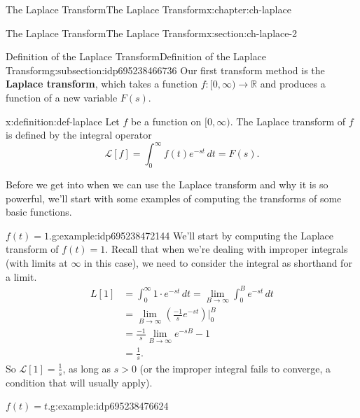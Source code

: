 \documentclass[oneside,10pt,]{book}
\newcommand{\terminology}[1]{\textbf{#1}}
\numberwithin{equation}{section}
\newcommand{\R}{\mathbb{R}}
\numberwithin{equation}{section}
\newcommand{\amp}{&}
\begin{document}
\begin{chapterptx}{The Laplace Transform}{}{The Laplace Transform}{}{}{x:chapter:ch-laplace}
%
%
\typeout{************************************************}
\typeout{************************************************}
%
\begin{sectionptx}{The Laplace Transform}{}{The Laplace Transform}{}{}{x:section:ch-laplace-2}
%
%
\typeout{************************************************}
\typeout{************************************************}
%
\begin{subsectionptx}{Definition of the Laplace Transform}{}{Definition of the Laplace Transform}{}{}{g:subsection:idp695238466736}
Our first transform method is the \terminology{Laplace transform}, which takes a function \(f:[0,\infty) \to \R\) and produces a function of a new variable \(F(s)\).%
\begin{definition}{}{x:definition:def-laplace}%
Let \(f\) be a function on \([0,\infty)\). The Laplace transform of \(f\) is defined by the integral operator%
\begin{equation*}
\mathcal{L}[f] = \int_0^\infty f(t) e^{-st} \, dt = F(s).
\end{equation*}
%
\end{definition}
Before we get into when we can use the Laplace transform and why it is so powerful, we'll start with some examples of computing the transforms of some basic functions.%
\begin{example}{\(f(t) = 1\).}{g:example:idp695238472144}%
We'll start by computing the Laplace transform of \(f(t) = 1\). Recall that when we're dealing with improper integrals (with limits at \(\infty\) in this case), we need to consider the integral as shorthand for a limit.%
%
\begin{align*}
L[1] \amp = \int_0^\infty 1 \cdot e^{-st} \, dt = \lim_{B \to \infty} \int_0^B e^{-st} \, dt\\
\amp = \lim_{B \to \infty} \left(\frac{-1}{s} e^{-st}\right) \bigg\rvert_0^B\\
\amp = \frac{-1}{s} \lim_{B\to\infty} e^{-sB} - 1\\
\amp = \frac{1}{s}.
\end{align*}
So \(\mathcal{L}[1] = \frac{1}{s}\), as long as \(s >0\) (or the improper integral fails to converge, a condition that will usually apply).%
\end{example}
\begin{example}{\(f(t) = t\).}{g:example:idp695238476624}%

\end{example}
\end{subsectionptx}
\end{sectionptx}
\end{chapterptx}
\end{document}
